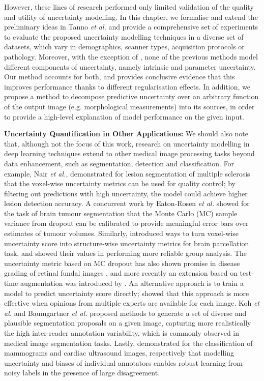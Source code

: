 However, these lines of research performed only limited validation of the quality and utility of uncertainty modelling. In this chapter, we formalise and extend the preliminary ideas in Tanno \emph{et al.} \cite{tanno2017bayesian} and provide a comprehensive set of experiments to evaluate the proposed uncertainty modelling techniques in a diverse set of datasets, which vary in demographics, scanner types, acquisition protocols or pathology. Moreover, with the exception of \cite{tanno2017bayesian}, none of the previous methods model different components of uncertainty, namely intrinsic and parameter uncertainty. Our method accounts for both, and provides conclusive evidence that this improves performance thanks to different regularisation effects. In addition, we propose a method to decompose predictive uncertainty over an arbitrary function of the output image (e.g. morphological measurements) into its sources, in order to provide a high-level explanation of model performance on the given input. 


\textbf{Uncertainty Quantification in Other Applications:}
We should also note that, although not the focus of this work, research on uncertainty modelling in deep learning techniques extend to other medical image processing tasks beyond data enhancement, such as segmentation, detection and classification. For example, Nair \emph{et al.}, \cite{nair2018exploring} demonstrated for lesion segmentation of multiple sclerosis that the voxel-wise uncertainty metrics can be used for quality control; by filtering out predictions with high uncertainty, the model could achieve higher lesion detection accuracy. A concurrent work by Eaton-Rosen \emph{et al.} \cite{eaton2018towards} showed for the task of brain tumour segmentation that the Monte Carlo (MC) sample variance from dropout \cite{gal2015dropout} can be calibrated to provide meaningful error bars over estimates of tumour volumes. Similarly,  \cite{roy2019bayesian} introduced ways to turn voxel-wise uncertainty score into structure-wise uncertainty metrics for brain parcellation task, and showed their values in performing more reliable group analysis. The uncertainty metric based on MC dropout has also shown promise in disease grading of retinal fundal images \cite{worrall2016automated,leibig2017leveraging}, and more recently an extension based on test-time augmentation was introduced by \cite{ayhan2018test}. An alternative approach is to train a model to predict uncertainty score directly; \cite{Raghu2018DirectUP} showed that this approach is more effective when opinions from multiple experts are available for each image. Koh \emph{et al.} \cite{kohl2018probabilistic} and Baumgartner \emph{et al.} \cite{PHiSeg2019Baumgartner} proposed methods to generate a set of diverse and plausible segmentation proposals on a given image, capturing more realistically the high inter-reader annotation variability, which is commonly observed in medical image segmentation tasks. Lastly, \cite{raykar2010learning,tanno2019learning} demonstrated for the classification of mammograms and cardiac ultrasound images, respectively that modelling uncertainty and biases of individual annotators enables robust learning from noisy labels in the presence of large disagreement. 


